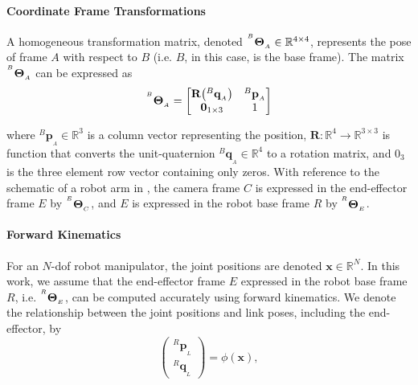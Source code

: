 \paragraph{Coordinate Frame Transformations} A homogeneous transformation matrix, denoted ${}^{^B}\mathbf{\Theta}_{_A}\in\mathbb{R}^{4 \times 4}$, represents the pose of frame $A$ with respect to $B$ (i.e. $B$, in this case, is the base frame).
The matrix ${}^{^B}\mathbf{\Theta}_{_A}$ can be expressed as
\begin{equation}
{}^{^B}\mathbf{\Theta}_{_A} = 
    \begin{bmatrix}
     \mathbf{R}\big({}^{B}\mathbf{q}_{_A}\big) & {}^{B}\mathbf{p}_{_A} \\
     \mathbf{0}_{1\times3} & 1
    \end{bmatrix}
    \label{c1:eq:ht}
\end{equation}

where ${}^{B}\mathbf{p}_{_A}\in\mathbb{R}^3$ is a column vector representing the position, $\mathbf{R}:\mathbb{R}^4\rightarrow\mathbb{R}^{3\times 3}$ is function that converts the unit-quaternion ${}^{B}\mathbf{q}_{_A}\in\mathbb{R}^4$ to a rotation matrix, and $0_3$ is the three element row vector containing only zeros.
With reference to the schematic of a robot arm in , the camera frame $C$ is expressed in the end-effector frame $E$ by ${}^{^E}\mathbf{\Theta}_{_C}$, and $E$ is expressed in the robot base frame $R$ by ${}^{^R}\mathbf{\Theta}_{_E}$. 

\paragraph{Forward Kinematics} For an $N$-\gls{dof} robot manipulator, the joint positions are denoted $\mathbf{x}\in\mathbb{R}^N$. In this work, we assume that the end-effector frame $E$ expressed in the robot base frame $R$, i.e. ${}^{^R}\mathbf{\Theta}_{_E}$, can be computed accurately using forward kinematics. We denote the relationship between the joint positions and link poses, including the end-effector, by
\begin{equation}
    \begin{pmatrix}
         {}^{R}\mathbf{p}_{_L}\\
         {}^{R}\mathbf{q}_{_L}
    \end{pmatrix}
    = \phi(\mathbf{x}),
    \label{c1:eq:fk}
\end{equation}

